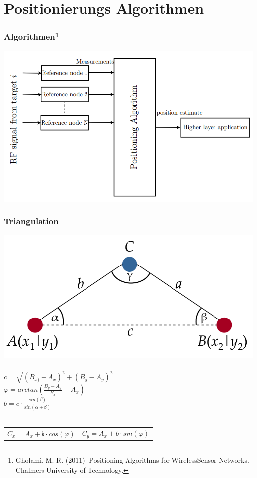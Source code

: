 \section{Positionierungs Algorithmen}
\label{sec:algorithmen}



\begin{frame}
  \frametitle{Algorithmen\footnote{Gholami, M. R. (2011). Positioning Algorithms for
      WirelessSensor Networks. Chalmers University of Technology.}}

  \begin{center}
    \includegraphics[scale=0.35]{img/algo_1}
  \end{center}
\end{frame}

\begin{frame}
  \frametitle{Triangulation}

  \begin{center}
    \includegraphics[scale=0.2]{img/triang}\\~\\

    $c = \sqrt{(B_{x)} - A_{x})^2 + (B_{y} - A_{y})^2}$\\
    $\varphi = arctan(\frac{B_{y} - A_{y}}{B_{x}} - A_{x})$\\
    $b = c \cdot \frac{sin(\beta)}{sin(\alpha + \beta)}$\\~\\

     \begin{tabular}{rr}
       $C_{x} = A_{x} + b \cdot cos(\varphi)$ & $C_{y} = A_{x} + b \cdot sin(\varphi)$ \\ 
     \end{tabular}
  \end{center}
\end{frame}

